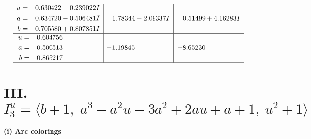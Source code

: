\documentclass[1p]{elsarticle_modified}
\theoremstyle{definition}
\begin{document}
$$\begin{array}{c|c|c}
\begin{aligned}
u &= -0.630422 - 0.239022 I \\
a &= \phantom{-}0.634720 - 0.506481 I \\
b &= \phantom{-}0.705580 + 0.807851 I\end{aligned}
 & \phantom{-}1.78344 - 2.09337 I & \phantom{-}0.51499 + 4.16283 I \\ \hline\begin{aligned}
u &= \phantom{-}0.604756\phantom{ +0.000000I} \\
a &= \phantom{-}0.500513\phantom{ +0.000000I} \\
b &= \phantom{-}0.865217\phantom{ +0.000000I}\end{aligned}
 & -1.19845\phantom{ +0.000000I} & -8.65230\phantom{ +0.000000I}\\
 \hline 
 \end{array}$$\newpage\newpage\renewcommand{\arraystretch}{1}
\centering \section*{III. $I^u_{3}= \langle b+1,\;a^3- a^2 u-3 a^2+2 a u+a+1,\;u^2+1 \rangle$}
\flushleft \textbf{(i) Arc colorings}\\
\end{document}
